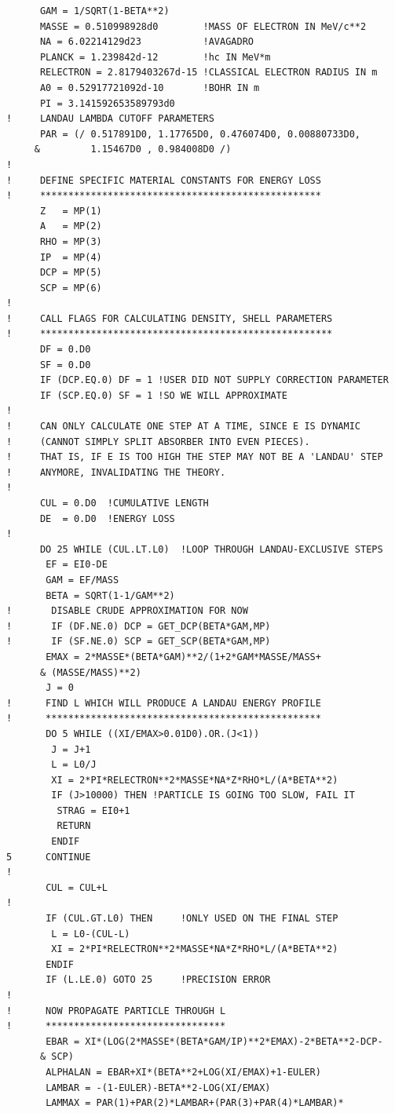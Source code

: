 \begin{lstlisting}
      GAM = 1/SQRT(1-BETA**2)
      MASSE = 0.510998928d0        !MASS OF ELECTRON IN MeV/c**2
      NA = 6.02214129d23           !AVAGADRO
      PLANCK = 1.239842d-12        !hc IN MeV*m
      RELECTRON = 2.8179403267d-15 !CLASSICAL ELECTRON RADIUS IN m
      A0 = 0.52917721092d-10       !BOHR IN m
      PI = 3.141592653589793d0      
!     LANDAU LAMBDA CUTOFF PARAMETERS
      PAR = (/ 0.517891D0, 1.17765D0, 0.476074D0, 0.00880733D0, 
     &         1.15467D0 , 0.984008D0 /)
!
!     DEFINE SPECIFIC MATERIAL CONSTANTS FOR ENERGY LOSS
!     **************************************************
      Z   = MP(1)
      A   = MP(2)
      RHO = MP(3)
      IP  = MP(4)
      DCP = MP(5)
      SCP = MP(6)
!
!     CALL FLAGS FOR CALCULATING DENSITY, SHELL PARAMETERS
!     ****************************************************
      DF = 0.D0
      SF = 0.D0
      IF (DCP.EQ.0) DF = 1 !USER DID NOT SUPPLY CORRECTION PARAMETER
      IF (SCP.EQ.0) SF = 1 !SO WE WILL APPROXIMATE
!      
!     CAN ONLY CALCULATE ONE STEP AT A TIME, SINCE E IS DYNAMIC
!     (CANNOT SIMPLY SPLIT ABSORBER INTO EVEN PIECES).
!     THAT IS, IF E IS TOO HIGH THE STEP MAY NOT BE A 'LANDAU' STEP
!     ANYMORE, INVALIDATING THE THEORY.
!
      CUL = 0.D0  !CUMULATIVE LENGTH
      DE  = 0.D0  !ENERGY LOSS
!
      DO 25 WHILE (CUL.LT.L0)  !LOOP THROUGH LANDAU-EXCLUSIVE STEPS
       EF = EI0-DE
       GAM = EF/MASS
       BETA = SQRT(1-1/GAM**2)
!       DISABLE CRUDE APPROXIMATION FOR NOW
!       IF (DF.NE.0) DCP = GET_DCP(BETA*GAM,MP)
!       IF (SF.NE.0) SCP = GET_SCP(BETA*GAM,MP)
       EMAX = 2*MASSE*(BETA*GAM)**2/(1+2*GAM*MASSE/MASS+
      & (MASSE/MASS)**2)
       J = 0
!      FIND L WHICH WILL PRODUCE A LANDAU ENERGY PROFILE
!      *************************************************
       DO 5 WHILE ((XI/EMAX>0.01D0).OR.(J<1))
        J = J+1
        L = L0/J
        XI = 2*PI*RELECTRON**2*MASSE*NA*Z*RHO*L/(A*BETA**2)
        IF (J>10000) THEN !PARTICLE IS GOING TOO SLOW, FAIL IT
         STRAG = EI0+1
         RETURN
        ENDIF 
5      CONTINUE      
!
       CUL = CUL+L
!
       IF (CUL.GT.L0) THEN     !ONLY USED ON THE FINAL STEP       
        L = L0-(CUL-L)
        XI = 2*PI*RELECTRON**2*MASSE*NA*Z*RHO*L/(A*BETA**2)
       ENDIF
       IF (L.LE.0) GOTO 25     !PRECISION ERROR
!
!      NOW PROPAGATE PARTICLE THROUGH L
!      ********************************
       EBAR = XI*(LOG(2*MASSE*(BETA*GAM/IP)**2*EMAX)-2*BETA**2-DCP-
      & SCP)
       ALPHALAN = EBAR+XI*(BETA**2+LOG(XI/EMAX)+1-EULER)
       LAMBAR = -(1-EULER)-BETA**2-LOG(XI/EMAX)
       LAMMAX = PAR(1)+PAR(2)*LAMBAR+(PAR(3)+PAR(4)*LAMBAR)*

\end{lstlisting}
